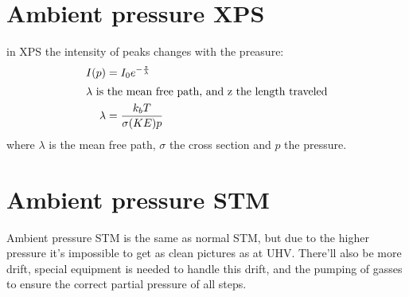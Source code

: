 \documentclass[article,oneside]{memoir}
\begin{document}
\section{Ambient pressure XPS}
in XPS the intensity of peaks changes with the preasure:
\begin{align*}
        I(p)&=I_{0}e^{-\frac{z}{\lambda}}\\
        \intertext{$\lambda$ is the mean free path, and z the length traveled}
        \lambda &= \frac{k_{b}T}{\sigma(KE)p}
\end{align*}
where $\lambda$ is the  mean free path, $\sigma$ the cross section and $p$ the pressure.

\section{Ambient pressure STM}
Ambient pressure STM is the same as normal STM, but due to the higher pressure it's impossible to get as clean pictures as at UHV. There'll also be more drift, special equipment is needed to handle this drift, and the pumping of gasses to ensure the correct partial pressure of all steps.
\end{document}

